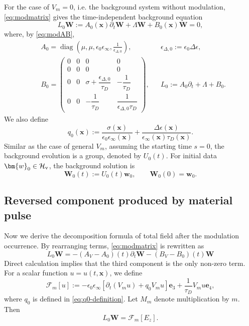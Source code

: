 \documentclass[11pt,reqno]{amsart}
\newcommand{\diag}{\operatorname{diag}}
\numberwithin{equation}{section}
\begin{document}
For the case of $V_m=0$, i.e. the background system without modulation, \eqref{eq:modmatrix} gives the time-independent background equation
\begin{equation*}
    L_0\bm{W}:=A_0(\bm{x})\partial_t \bm{W}+\Lambda \bm{W}+B_0(\bm{x})\bm{W}=0,
\end{equation*}
where, by \eqref{eq:modAB},
\begin{equation}\label{eq:bgAB}
\begin{aligned}
&A_0=\diag\left(\mu,\mu,\epsilon_0\epsilon_\infty,\frac{1}{\epsilon_{\Delta,0}}\right),
&&
\epsilon_{\Delta,0}:=\epsilon_0\Delta\epsilon, \\
&B_0=
\begin{pmatrix}
0 & 0 & 0 & 0\\
0 & 0 & 0 & 0\\
0 & 0 & \sigma+\dfrac{\epsilon_{\Delta,0}}{\tau_D} & -\dfrac1{\tau_D}\\
0 & 0 & -\dfrac1{\tau_D} & \dfrac1{\epsilon_{\Delta,0}\tau_D}
\end{pmatrix},
&&
L_0:=A_0\partial_t+\Lambda+B_0.
\end{aligned}
\end{equation}
We also define
\begin{equation}\label{eq:q0-definition}
q_0(\bm{x}):=\frac{\sigma(\bm{x})}{\epsilon_0\epsilon_\infty(\bm{x})} + \frac{\Delta\epsilon(\bm{x})}{\epsilon_\infty(\bm{x})\tau_D(\bm{x})}.
\end{equation}
Similar as the case of general $V_m$, assuming the starting time $s=0$, the background evolution is a group, denoted by $U_0(t)$. For initial data $\bm{w}_0\in\mathcal H_{\rm v}$, the background solution is
\begin{equation}\label{eq:unpert}
\bm{W}_0(t):=U_0(t)\bm{w}_0, \qquad \bm{W}_0(0)=\bm{w}_0.
\end{equation}

\subsection{Reversed component produced by material pulse}

Now we derive the decomposition formula of total field after the modulation occurrence. By rearranging terms, \eqref{eq:modmatrix} is rewritten as
\begin{equation*}
    L_0\bm{W} = -(A_V-A_0)(t)\partial_t\bm{W} - (B_V-B_0)(t)\bm{W}
\end{equation*}
Direct calculation implies that the third component is the only non-zero term. For a scalar function $u=u(t,\bm{x})$, we define
\begin{equation*}
\bm{\mathcal F}_m[u] :=-\epsilon_0\epsilon_\infty \left[\partial_t(V_mu)+q_0V_mu\right]\bm{e}_3 +\frac1{\tau_D}V_mu \bm{e}_4,
\end{equation*}
where $q_0$ is defined in \eqref{eq:q0-definition}. Let $M_m$ denote multiplication by $m$. Then
\begin{equation*}
L_0\bm{W}= \bm{\mathcal F}_m[E_z].
\end{equation*}
\end{document}
